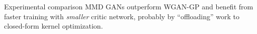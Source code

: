 \documentclass[xcolor={table}]{beamer}
\begin{document}
\begin{frame}{}
\begin{columns}[T, totalwidth=\textwidth]
\begin{column}{.32\textwidth}
    \begin{block}{Experimental comparison}
      MMD GANs outperform WGAN-GP and benefit from faster training with \emph{smaller} critic network,
      probably by ``offloading'' work to closed-form kernel optimization.
    \end{block}
    \vspace*{-1.3cm}


\end{column}
\end{columns}
\end{frame}
\end{document}
